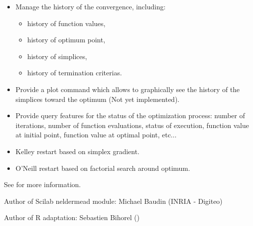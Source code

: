 \begin{Description}
\begin{itemize}
\begin{itemize}
\end{itemize}

\item Manage the history of the convergence, including: \begin{itemize}

\item history of function values,
\item history of optimum point,
\item history of simplices,
\item history of termination criterias.

\end{itemize}

\item Provide a plot command which allows to graphically see the history
of the simplices toward the optimum (Not yet implemented).
\item Provide query features for the status of the optimization process:
number of iterations, number of function evaluations, status of execution,
function value at initial point, function value at optimal point, etc...
\item Kelley restart based on simplex gradient.
\item O'Neill restart based on factorial search around optimum.

\end{itemize}

\end{Description}
%
\begin{Details}\relax

See  for more information.
\end{Details}
%
\begin{Author}\relax
Author of Scilab neldermead module: Michael Baudin (INRIA - Digiteo)

Author of R adaptation: Sebastien Bihorel ()
\end{Author}
%
